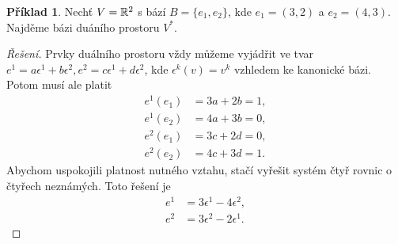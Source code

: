 \documentclass[a4paper,11pt]{report}
\theoremstyle{theorem}
\theoremstyle{remark}
\theoremstyle{definition}
\newtheorem*{example}{Příklad}
\begin{document}
			\begin{example}
				Nechť $V={\mathbb R}^2$ s bází $B=\{e_1,e_2\}$, kde $e_1=(3,2)$ a $e_2=(4,3)$. Najděme bázi duáního prostoru $V^*$.
			\end{example}
			\begin{proof}[Řešení]
				Prvky duálního prostoru vždy můžeme vyjádřit ve tvar $e^1 = a \epsilon^1 + b \epsilon^2, e^2 = c \epsilon^1 + d \epsilon^2$, kde $\epsilon^k(v) = v^k$ vzhledem ke kanonické bázi. Potom musí ale platit
				\begin{align*}
					e^1(e_1) &= 3a + 2b = 1,
				\\
					e^1(e_2) &= 4a + 3b = 0,
				\\
					e^2(e_1) &= 3c + 2d = 0,
				\\
					e^2(e_2) &= 4c + 3d = 1.
				\end{align*}
				Abychom uspokojili platnost nutného vztahu, stačí vyřešit systém čtyř rovnic o čtyřech neznámých. Toto řešení je
				\begin{align*}
					e^1 &= 3\epsilon^1 - 4\epsilon^2,
				\\
					e^2 &= 3\epsilon^2 - 2\epsilon^1.
				\end{align*}
			\end{proof}
			
\end{document}
